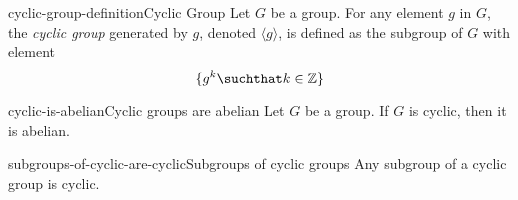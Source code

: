\documentclass[preview]{standalone}
\begin{document}
\genpage

\begin{snippetdefinition}{cyclic-group-definition}{Cyclic Group}
    Let \(G\) be a group. For any element \(g\) in \(G\),
    the \textit{cyclic group} generated by \(g\), denoted \(\langle g \rangle\),
    is defined as the subgroup of \(G\) with element
    \[
        \{ g^k \suchthat k \in \mathbb{Z} \}
    \]
\end{snippetdefinition}

\begin{snippetcorollary}{cyclic-is-abelian}{Cyclic groups are abelian}
    Let \(G\) be a group. If \(G\) is cyclic, then it is abelian.
\end{snippetcorollary}


\begin{snippettheorem}{subgroups-of-cyclic-are-cyclic}{Subgroups of cyclic groups}
    Any subgroup of a cyclic group is cyclic.
\end{snippettheorem}
\end{document}
